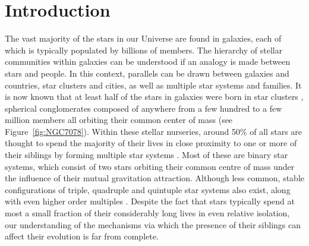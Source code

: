 \pagestyle{fancy}
\headheight 20pt
\chead{}
\lfoot{}
\cfoot{\thepage}
\rfoot{}
\renewcommand{\headrulewidth}{0.1pt}
\renewcommand{\footrulewidth}{0.1pt}

\chapter{Introduction} \label{chapter1} 
\thispagestyle{fancy} 

%
The vast majority of the stars in our
Universe are found in galaxies, each of which is typically populated
by billions of members.  The hierarchy of stellar communities within
galaxies can be understood if an analogy is made between stars and
people.  In this context, parallels can be drawn between galaxies and
countries, star clusters and cities, as well as multiple star systems
and families.  It is now known that at least half of the stars in
galaxies were born in star clusters \citep[e.g.][]{kroupa02a,
  kroupa02b}, spherical conglomerates 
composed of anywhere from a few hundred to a few million members all
orbiting their common center of mass (see
Figure~\ref{fig:NGC7078}).  Within these stellar 
nurseries, around 50\% of all stars are thought to spend the
majority of their lives in 
close proximity to one or more of their siblings by forming multiple 
star systems \citep[e.g.][]{durisen94, bate97a, bate97b, kroupa01,
  sollima10}.  Most of these are 
binary star systems, which consist of two stars orbiting their common 
centre of mass under the influence of their mutual gravitation
attraction.  Although less common, stable configurations of triple,
quadruple and quintuple star systems also exist, along with even
higher order multiples \citep[e.g.][]{latham05, eggleton08,
  tokovinin08}.  Despite the 
fact that stars typically spend at most a small fraction of their
considerably long lives in even relative isolation, our understanding
of the mechanisms via which the presence of their siblings can affect
their evolution is far from complete.  

